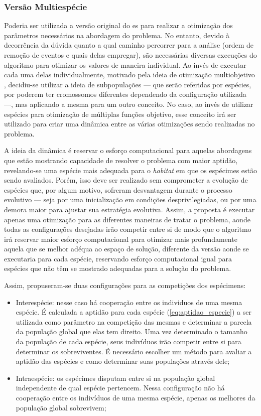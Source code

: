 \subsubsection{Versão Multiespécie}
\label{sssec:multiespecie}

Poderia ser utilizada a versão original do \acs{es} para realizar a
otimização dos parâmetros necessários na abordagem do problema. No
entanto, devido à decorrência da dúvida quanto a qual caminho
percorrer para a análise (ordem de remoção de eventos e quais delas
empregar), são necessárias diversas execuções
do algoritmo para otimizar os valores de maneira individual. Ao invés
de executar cada uma delas individualmente, motivado pela ideia de otimização
multiobjetivo \cite[cap. 9]{eiben2003introduction}, decidiu-se utilizar
a ideia de subpopulações --- que serão referidas por espécies, por
poderem ter cromossomos diferentes dependendo da configuração
utilizada ---, mas aplicando a mesma para um outro conceito. No caso,
ao invés de utilizar espécies para otimização de múltiplas funções
objetivo, esse conceito irá ser utilizado para criar uma dinâmica
entre as várias otimizações sendo realizadas no problema.

A ideia da dinâmica é reservar o esforço computacional para aquelas
abordagens que estão mostrando capacidade de resolver o problema com
maior aptidão, revelando-se uma espécie mais adequada para o
\emph{habitat} em que os espécimes estão sendo avaliados. Porém, isso
deve ser realizado sem comprometer a evolução de espécies que, por
algum motivo, sofreram desvantagem durante o processo evolutivo ---
seja por uma inicialização em condições desprivilegiadas, ou por uma
demora maior para ajustar sua estratégia evolutiva. Assim, a proposta
é executar apenas uma otimização para as diferentes maneiras de
tratar o problema, aonde todas as configurações desejadas irão
competir entre si de modo que o algoritmo irá reservar maior
esforço computacional para otimizar mais profundamente aquela que se
melhor adéqua ao espaço de solução, diferente da versão aonde se
executaria para cada espécie, reservando esforço computacional igual
para espécies que não têm se mostrado adequadas para a solução do
problema.

Assim, propuseram-se duas configurações para as competições dos
espécimens:

\begin{itemize}
\item Interespécie: nesse caso há cooperação entre os individuos de
uma mesma espécie. É calculada a aptidão para cada espécie
(\ref{eq:aptidao_especie}) a ser utilizada como parâmetro na
competição das mesmas e determinar a parcela da população global que
elas tem direito. Uma vez determinado o tamanho da população de cada
espécie, seus indivíduos irão competir entre si para determinar os
sobreviventes. É necessário escolher um método para avaliar a aptidão
das espécies e como determinar suas populações através dele;
\item Intraespécie: os espécimes disputam entre si na população global
independente de qual espécie pertencem. Nessa configuração não há
cooperação entre os indivíduos de uma mesma espécie, apenas os
melhores da população global sobrevivem;
\end{itemize}

